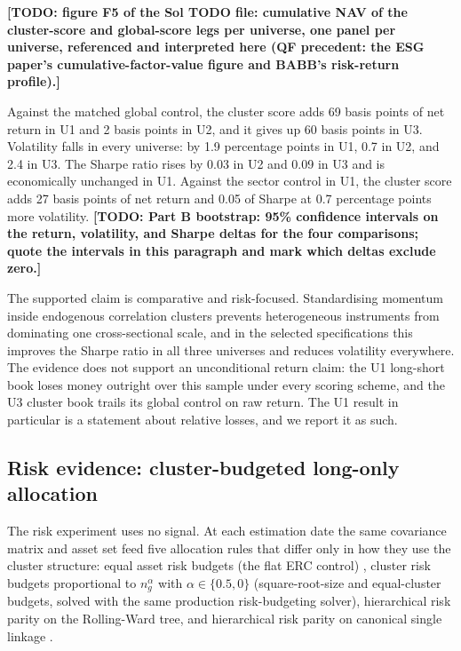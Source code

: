 \documentclass[11pt]{article}
\theoremstyle{remark}
\newcommand{\TODO}[1]{\textbf{[TODO: #1]}}
\begin{document}
\TODO{figure F5 of the Sol TODO file: cumulative NAV of the cluster-score and
global-score legs per universe, one panel per universe, referenced and
interpreted here (QF precedent: the ESG paper's cumulative-factor-value
figure and BABB's risk-return profile).}

Against the matched global control, the cluster score adds 69 basis points of
net return in U1 and 2 basis points in U2, and it gives up 60 basis points in
U3. Volatility falls in every universe: by 1.9 percentage points in U1, 0.7 in
U2, and 2.4 in U3. The Sharpe ratio rises by 0.03 in U2 and 0.09 in U3 and is
economically unchanged in U1. Against the sector control in U1, the cluster
score adds 27 basis points of net return and 0.05 of Sharpe at 0.7 percentage
points more volatility. \TODO{Part B bootstrap: 95\% confidence intervals on
the return, volatility, and Sharpe deltas for the four comparisons; quote the
intervals in this paragraph and mark which deltas exclude zero.}

The supported claim is comparative and risk-focused. Standardising momentum
inside endogenous correlation clusters prevents heterogeneous instruments from
dominating one cross-sectional scale, and in the selected specifications this
improves the Sharpe ratio in all three universes and reduces volatility
everywhere. The evidence does not support an unconditional return claim: the
U1 long-short book loses money outright over this sample under every scoring
scheme, and the U3 cluster book trails its global control on raw return. The
U1 result in particular is a statement about relative losses, and we report it
as such.

\subsection{Risk evidence: cluster-budgeted long-only allocation}
\label{sec:risk}

The risk experiment uses no signal. At each estimation date the same
covariance matrix and asset set feed five allocation rules that differ only in
how they use the cluster structure: equal asset risk budgets (the flat ERC
control) \citep{maillard2010properties}, cluster risk budgets proportional to
$n_g^{\alpha}$ with $\alpha \in \{0.5, 0\}$ (square-root-size and
equal-cluster budgets, solved with the same production risk-budgeting solver),
hierarchical risk parity on the Rolling-Ward tree, and hierarchical risk
parity on canonical single linkage \citep{lopezdeprado2016building}.
\end{document}
